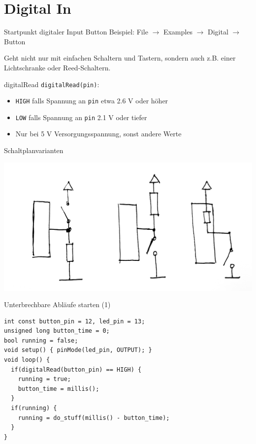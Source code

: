 \documentclass[bigger]{beamer}
\begin{document}
\section{Digital In}
\label{sec:org65d52e5}
\begin{frame}[label={sec:org74e126e}]{Startpunkt digitaler Input}
Button Beispiel: File \(\rightarrow\) Examples \(\rightarrow\) Digital
\(\rightarrow\) Button

Geht nicht nur mit einfachen Schaltern und Tastern, sondern auch
z.B. einer Lichtschranke oder Reed-Schaltern.
\end{frame}

\begin{frame}[fragile,label={sec:org89246d6}]{digitalRead}
 \texttt{digitalRead(pin)}: 
\begin{itemize}
\item \texttt{HIGH} falls Spannung an \texttt{pin} etwa 2.6 V oder höher
\item \texttt{LOW} falls Spannung an \texttt{pin} 2.1 V oder tiefer
\item Nur bei 5 V Versorgungsspannung, sonst andere Werte
\end{itemize}
\end{frame}

\begin{frame}[label={sec:orge2a8ae6}]{Schaltplanvarianten}
\begin{center}
\includegraphics[width=.9\linewidth]{./img/pullup.jpg}
\end{center}
\end{frame}

\begin{frame}[fragile,label={sec:org6ea5c1a}]{Unterbrechbare Abläufe starten (1)}
 \begin{verbatim}
int const button_pin = 12, led_pin = 13;
unsigned long button_time = 0;
bool running = false;
void setup() { pinMode(led_pin, OUTPUT); }
void loop() {
  if(digitalRead(button_pin) == HIGH) {
    running = true;
    button_time = millis();
  }
  if(running) {
    running = do_stuff(millis() - button_time);
  }
}
\end{verbatim}
\end{frame}
\end{document}
